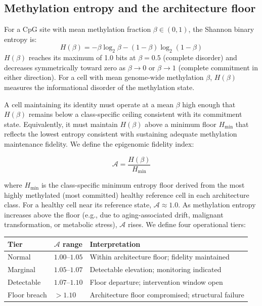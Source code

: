 \documentclass[12pt,a4paper]{article}
\newcommand{\Hmin}{H_{\min}}
\newcommand{\Ascore}{\mathcal{A}}
\begin{document}
\subsection{Methylation entropy and the architecture floor}
\label{sec:floor}

For a CpG site with mean methylation fraction $\beta \in (0,1)$, the Shannon
binary entropy is:
\begin{equation}
  H(\beta) = -\beta \log_2 \beta - (1-\beta)\log_2(1-\beta)
  \label{eq:shannon}
\end{equation}
$H(\beta)$ reaches its maximum of 1.0 bits at $\beta = 0.5$ (complete disorder)
and decreases symmetrically toward zero as $\beta \to 0$ or $\beta \to 1$
(complete commitment in either direction). For a cell with mean genome-wide
methylation $\beta$, $H(\beta)$ measures the informational disorder of the
methylation state.

A cell maintaining its identity must operate at a mean $\beta$ high enough
that $H(\beta)$ remains below a class-specific ceiling consistent with its
commitment state. Equivalently, it must maintain $H(\beta)$ above a minimum
floor $\Hmin$ that reflects the lowest entropy consistent with sustaining
adequate methylation maintenance fidelity. We define the epigenomic fidelity
index:

\begin{equation}
  \boxed{\Ascore = \frac{H(\beta)}{\Hmin}}
  \label{eq:ascore}
\end{equation}

where $\Hmin$ is the class-specific minimum entropy floor derived from the
most highly methylated (most committed) healthy reference cell in each
architecture class. For a healthy cell near its reference state, $\Ascore
\approx 1.0$. As methylation entropy increases above the floor (e.g., due
to aging-associated drift, malignant transformation, or metabolic stress),
$\Ascore$ rises. We define four operational tiers:

\begin{center}
\begin{tabular}{llp{7.5cm}}
\toprule
\textbf{Tier} & \textbf{$\Ascore$ range} & \textbf{Interpretation} \\
\midrule
Normal      & $1.00$--$1.05$ & Within architecture floor; fidelity maintained \\
Marginal    & $1.05$--$1.07$ & Detectable elevation; monitoring indicated \\
Detectable  & $1.07$--$1.10$ & Floor departure; intervention window open \\
Floor breach & $> 1.10$      & Architecture floor compromised; structural failure \\
\bottomrule
\end{tabular}
\end{center}
\end{document}
